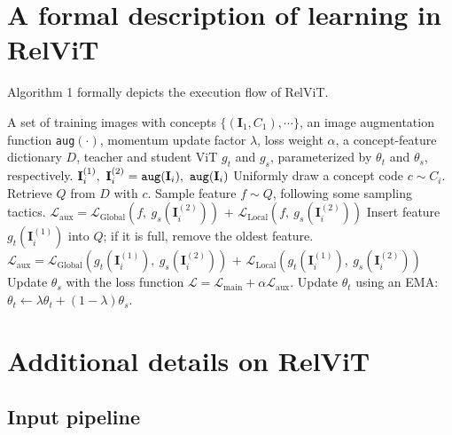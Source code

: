 \documentclass{article} \usepackage{iclr2022_conference,times}
\newcommand{\image}{\mathbf{I}}
\newcommand{\relvit}{RelViT }
\newcommand{\loss}{\mathcal{L}}
\begin{document}
\newpage
\appendix


\section{A formal description of learning in RelViT}

Algorithm 1 formally depicts the execution flow of RelViT.


\begin{algorithm}[H]
\small
\caption*{\small \textbf{Algorithm 1} RelViT: Concept-guided Vision Transformer 
\label{alg:main}}
\begin{algorithmic}[1]
\REQUIRE A set of training images with concepts $\{(\image_1, C_1), \cdots\}$, an image augmentation function \texttt{aug}$(\cdot)$, momentum update factor $\lambda$, loss weight $\alpha$, a concept-feature dictionary $D$, teacher and student ViT $g_t$ and $g_s$, parameterized by $\theta_t$ and $\theta_s$, respectively.
\FOR{$(\image_i, C_i)$ in $\{(\image_1, C_1), \cdots\}$}
  \STATE $\image_i^{(1)},~\image_i^{(2)} = \text{\texttt{aug}}(\image_i),~ \text{\texttt{aug}}(\image_i)$    
  \STATE Uniformly draw a concept code $c \sim C_i$. 
  \STATE Retrieve $Q$ from $D$ with $c$.
    \STATE Sample feature $f \sim Q$, following some sampling tactics.
    \STATE $\loss_{\operatorname{aux}} = \loss_{\operatorname{Global}}(f,~g_s(\image_i^{(2)}))$ + $\loss_{\operatorname{Local}}(f,~g_s(\image_i^{(2)}))$
    \STATE Insert feature $g_t(\image_i^{(1)})$ into $Q$; if it is full, remove the oldest feature.
    \ELSE
    \STATE $\loss_{\operatorname{aux}} = \loss_{\operatorname{Global}}(g_t(\image_i^{(1)}),~g_s(\image_i^{(2)}))$ + $\loss_{\operatorname{Local}}(g_t(\image_i^{(1)}),~g_s(\image_i^{(2)}))$
  \ENDIF
  \STATE Update $\theta_s$ with the loss function $\loss = \loss_{\operatorname{main}} + \alpha\loss_{\operatorname{aux}}$.
  \STATE Update $\theta_t$ using an EMA: $\theta_t \leftarrow \lambda\theta_t + (1-\lambda)\theta_s$.
\ENDFOR \\
\end{algorithmic}
\end{algorithm}


\section{Additional details on \relvit}

\subsection{Input pipeline}
\end{document}
